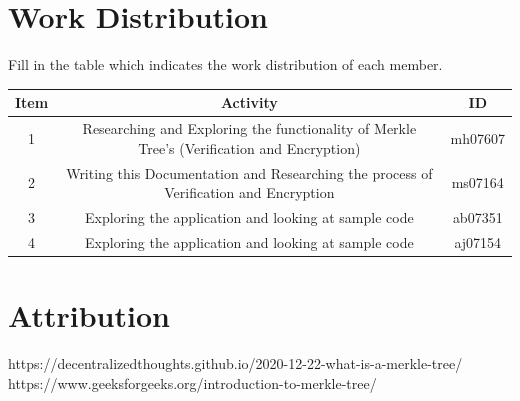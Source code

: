 \documentclass{article}
\begin{document}
\section{Work Distribution}
Fill in the table which indicates the work distribution of each member.
\begin{center}
  \begin{table}[h]
    \centering
    \begin{tabular}{|c|c|c|}
      \hline
      Item & Activity   & ID      \\ \hline
      1    & Researching and Exploring the functionality of Merkle Tree's (Verification and Encryption) & mh07607 \\ \hline
      2    & Writing this Documentation and Researching the process of Verification and Encryption & ms07164 \\ \hline
      3    & Exploring the application and looking at sample code & ab07351 \\ \hline
      4    & Exploring the application and looking at sample code & aj07154 \\ \hline
    \end{tabular}

    \label{tab:my-table6}
  \end{table}
\end{center}
\section{Attribution}

\begin{thebibliography}{9}
https://decentralizedthoughts.github.io/2020-12-22-what-is-a-merkle-tree/
https://www.geeksforgeeks.org/introduction-to-merkle-tree/
  \end{thebibliography}
\end{document}
